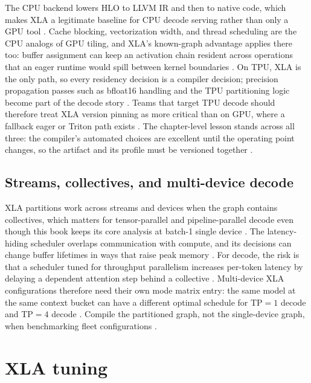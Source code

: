 The CPU backend lowers HLO to LLVM IR and then to native code, which makes XLA a legitimate baseline for CPU decode serving rather than only a GPU tool \citep{openxla2024,dlbook}. Cache blocking, vectorization width, and thread scheduling are the CPU analogs of GPU tiling, and XLA's known-graph advantage applies there too: buffer assignment can keep an activation chain resident across operations that an eager runtime would spill between kernel boundaries \citep{dlbook,openxla2024}. On TPU, XLA is the only path, so every residency decision is a compiler decision; precision propagation passes such as bfloat16 handling and the TPU partitioning logic become part of the decode story \citep{openxla2024,patel2025llminference}. Teams that target TPU decode should therefore treat XLA version pinning as more critical than on GPU, where a fallback eager or Triton path exists \citep{patel2025llminference,openxla2024}. The chapter-level lesson stands across all three: the compiler's automated choices are excellent until the operating point changes, so the artifact and its profile must be versioned together \citep{memoryfloor2026,chen2020compilerbasedhardw}.

\subsection{Streams, collectives, and multi-device decode}

XLA partitions work across streams and devices when the graph contains collectives, which matters for tensor-parallel and pipeline-parallel decode even though this book keeps its core analysis at batch-1 single device \citep{openxla2024,patel2025llminference}. The latency-hiding scheduler overlaps communication with compute, and its decisions can change buffer lifetimes in ways that raise peak memory \citep{openxla2024,memoryfloor2026}. For decode, the risk is that a scheduler tuned for throughput parallelism increases per-token latency by delaying a dependent attention step behind a collective \citep{patel2025llminference,liu2024deepseekv3}. Multi-device XLA configurations therefore need their own mode matrix entry: the same model at the same context bucket can have a different optimal schedule for TP${=}1$ decode and TP${=}4$ decode \citep{taxbreak2026,yirage2026}. Compile the partitioned graph, not the single-device graph, when benchmarking fleet configurations \citep{chen2020compilerbasedhardw,openxla2024}.

\section{XLA tuning}
\label{sec:ch15_xla_tuning}

